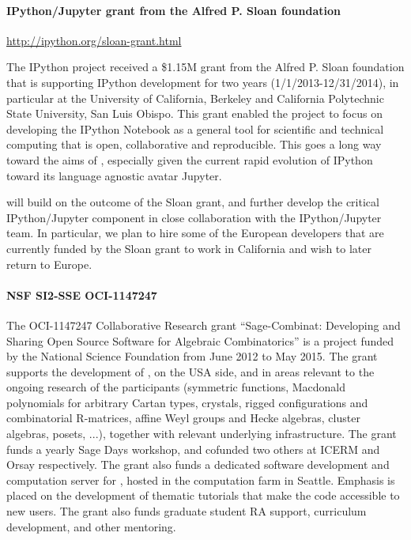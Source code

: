 \paragraph{IPython/Jupyter grant from the Alfred P. Sloan foundation}
\url{http://ipython.org/sloan-grant.html}

The IPython project received a \$1.15M grant from the Alfred P. Sloan
foundation that is supporting IPython development for two years
(1/1/2013-12/31/2014), in particular at the University of California,
Berkeley and California Polytechnic State University, San Luis Obispo.
This grant enabled the project to focus on developing the IPython
Notebook as a general tool for scientific and technical computing that
is open, collaborative and reproducible. This goes a long way toward
the aims  of \TheProject, especially given the current
rapid evolution of IPython toward its language agnostic avatar
Jupyter.

\TheProject will build on the outcome of the Sloan grant, and further
develop the critical IPython/Jupyter component in close collaboration
with the IPython/Jupyter team. In particular, we plan to hire some of
the European developers that are currently funded by the Sloan grant
to work in California and wish to later return to Europe.

\paragraph{NSF SI2-SSE OCI-1147247}


The OCI-1147247 Collaborative Research grant ``Sage-Combinat:
Developing and Sharing Open Source Software for Algebraic
Combinatorics'' is a project funded by the National Science Foundation
from June 2012 to May 2015. The grant supports the development of
\SageCombinat, on the USA side, and in areas relevant to the ongoing
research of the participants (symmetric functions, Macdonald
polynomials for arbitrary Cartan types, crystals, rigged
configurations and combinatorial R-matrices, affine Weyl groups and
Hecke algebras, cluster algebras, posets, ...), together with relevant
underlying infrastructure. The grant funds a yearly Sage Days
workshop, and cofunded two others at ICERM and Orsay respectively. The
grant also funds a dedicated software development and computation
server for \SageCombinat, hosted in the \Sage computation farm in
Seattle. Emphasis is placed on the development of thematic tutorials
that make the code accessible to new users. The grant also funds
graduate student RA support, curriculum development, and other
mentoring.

